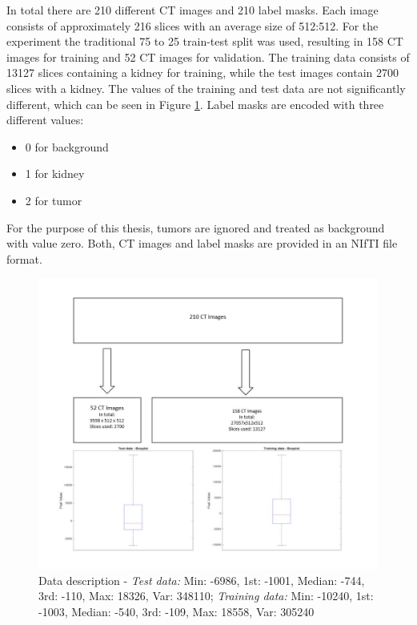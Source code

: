     In total there are 210 different CT images and 210 label masks. Each image consists of approximately 216 slices with an average size of 512:512. For the experiment the traditional 75 to 25 train-test split was used, resulting in 158 CT images for training and 52 CT images for validation. The training data consists of 13127 slices containing a kidney for training, while the test images contain 2700 slices with a kidney. The values of the training and test data are not significantly different, which can be seen in Figure \ref{fig:data_desc}. Label masks are encoded with three different values:
    \begin{itemize}
        \item 0 for background
        \item 1 for kidney
        \item 2 for tumor
    \end{itemize}
 For the purpose of this thesis, tumors are ignored and treated as background with value zero. Both, CT images and label masks are provided in an NIfTI \cite{Brainder..2012,Knipe.2005} file format. 
    


 \begin{figure}
 \centering
 \includegraphics[width=0.7\linewidth]{PICs/data_desc.JPG}
 \caption{Data description - \textit{Test data:} Min: -6986, 1st: -1001, Median: -744, 3rd: -110, Max: 18326, Var: 348110; 
 \textit{Training data:} Min: -10240, 1st: -1003, Median: -540, 3rd: -109, Max: 18558, Var: 305240 }
 \label{fig:data_desc}
 \end{figure}

